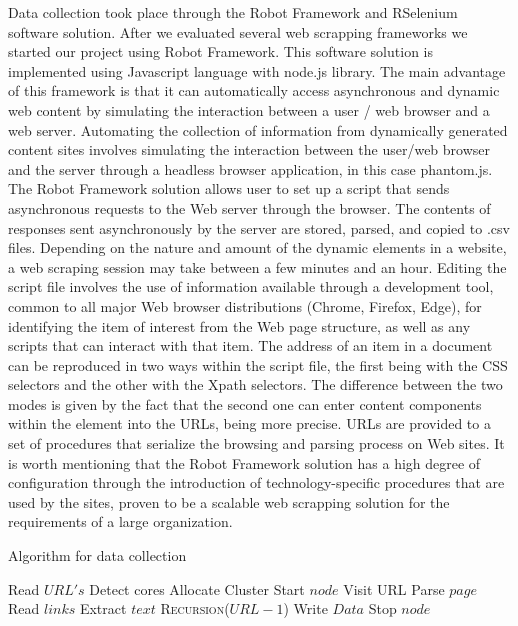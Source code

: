 \documentclass[]{article}
\begin{document}
Data collection took place through the Robot Framework and RSelenium software solution. 
After we evaluated several web scrapping frameworks we started our project using Robot Framework. This software solution is implemented using Javascript language with node.js library.
The main advantage of this framework is that it can automatically access asynchronous and dynamic web content by simulating the interaction between a user / web browser and a web server. Automating the collection of information from dynamically generated content sites involves simulating the interaction between the user/web browser and the server through a headless browser application, in this case phantom.js. The Robot Framework solution allows user to set up a script that sends asynchronous requests to the Web server through the browser. The contents of responses sent asynchronously by the server are stored, parsed, and copied to .csv files. Depending on the nature and amount of the dynamic elements in a website, a web scraping session may take between a few minutes and an hour.
Editing the script file involves the use of information available through a development tool, common to all major Web browser distributions (Chrome, Firefox, Edge), for identifying the item of interest from the Web page structure, as well as any scripts that can interact with that item. The address of an item in a document can be reproduced in two ways within the script file, the first being with the CSS selectors and the other with the Xpath selectors. The difference between the two modes is given by the fact that the second one can enter content components within the element into the URLs, being more precise. URLs are provided to a set of procedures that serialize the browsing and parsing process on Web sites. It is worth mentioning that the Robot Framework solution has a high degree of configuration through the introduction of technology-specific procedures that are used by the sites, proven to be a scalable web scrapping solution for the requirements of a large organization.


\begin{algorithm}[h]
	\caption{Algorithm for data collection}
	\label{alg:dc}
	\begin{algorithmic}
		\State Read $URL's$
		\State Detect cores
		\State Allocate Cluster
		 \State Start $node$
		 	\State Visit URL
		 			\State{}
		 		\Else
		 			\State Parse $page$
		 			\State Read $links$
		 			\State Extract $text$
		 			\State \Return \textsc{Recursion}{($URL-1$)}
		 		\EndIf
			\State Write $Data$
			\EndProcedure
		  \State Stop $node$
		\EndFor	
	\end{algorithmic}
\end{algorithm}
\end{document}

